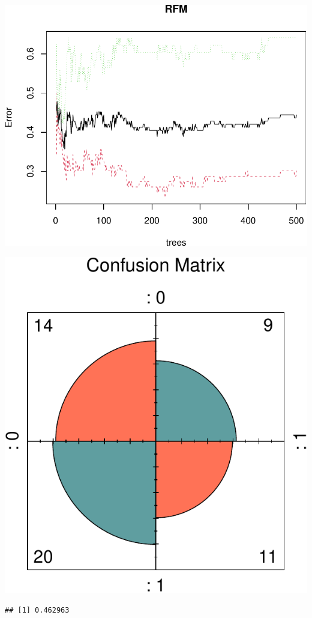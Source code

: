 \documentclass[11pt,preprint, authoryear]{elsarticle}
\numberwithin{equation}{section}
\numberwithin{figure}{section}
\numberwithin{table}{section}
\begin{document}
\includegraphics{ML_change_files/figure-latex/unnamed-chunk-5-1.pdf}

\includegraphics{ML_change_files/figure-latex/unnamed-chunk-7-1.pdf}

\begin{verbatim}
## [1] 0.462963
\end{verbatim}
\end{document}
